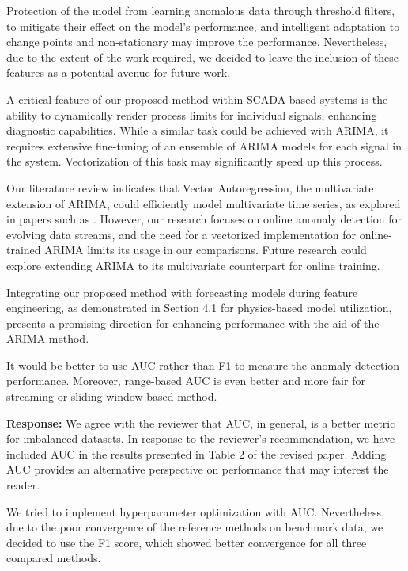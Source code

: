 \documentclass{article}
\makeatletter
\newenvironment{comment}{
\begin{sloppypar}\slshape
\vspace{5 mm}
\color{blue}
 \@beginparpenalty\@M
  \begin{list}{}{\setlength{\topsep}{0ex}%
  \setlength{\leftmargin}{\rightmargin}}\item[]
 \@beginparpenalty\@endparpenalty
}
{\end{list}
\end{sloppypar}
}
\makeatother
\begin{document}
\begin{enumerate}
        Protection of the model from learning anomalous data through threshold filters, to mitigate their effect on the model's performance, and intelligent adaptation to change points and non-stationary may improve the performance. Nevertheless, due to the extent of the work required, we decided to leave the inclusion of these features as a potential avenue for future work.

        A critical feature of our proposed method within SCADA-based systems is the ability to dynamically render process limits for individual signals, enhancing diagnostic capabilities. While a similar task could be achieved with ARIMA, it requires extensive fine-tuning of an ensemble of ARIMA models for each signal in the system. Vectorization of this task may significantly speed up this process.

        Our literature review indicates that Vector Autoregression, the multivariate extension of ARIMA, could efficiently model multivariate time series, as explored in papers such as \cite{Melnyk2016, Zhang2023}. However, our research focuses on online anomaly detection for evolving data streams, and the need for a vectorized implementation for online-trained ARIMA limits its usage in our comparisons. Future research could explore extending ARIMA to its multivariate counterpart for online training.

        Integrating our proposed method with forecasting models during feature engineering, as demonstrated in Section 4.1 for physics-based model utilization, presents a promising direction for enhancing performance with the aid of the ARIMA method.

  \item
        \begin{comment}
        It would be better to use AUC rather than F1 to measure the anomaly detection performance. Moreover, range-based AUC is even better and more fair for streaming or sliding window-based method.
        \end{comment}
        {\bf Response:}
        We agree with the reviewer that AUC, in general, is a better metric for imbalanced datasets. In response to the reviewer's recommendation, we have included AUC in the results presented in Table 2 of the revised paper. Adding AUC provides an alternative perspective on performance that may interest the reader.

        We tried to implement hyperparameter optimization with AUC. Nevertheless, due to the poor convergence of the reference methods on benchmark data, we decided to use the F1 score, which showed better convergence for all three compared methods.


\end{enumerate}
\end{document}
